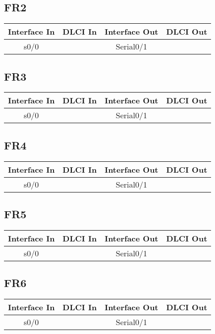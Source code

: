 \documentclass[12pt,a4paper,spanish]{article}
\begin{document}
\subsection{FR2}
\begin{tabular}{|c|c|c|c|}
\hline
Interface In & DLCI In & Interface Out & DLCI Out \\
\hline
\hline
 s0/0 &  & Serial0/1 &  \\
\hline
\end{tabular}

\subsection{FR3}
\begin{tabular}{|c|c|c|c|}
\hline
Interface In & DLCI In & Interface Out & DLCI Out \\
\hline
\hline
 s0/0 &  & Serial0/1 &  \\
\hline
\end{tabular}

\subsection{FR4}
\begin{tabular}{|c|c|c|c|}
\hline
Interface In & DLCI In & Interface Out & DLCI Out \\
\hline
\hline
 s0/0 &  & Serial0/1 &  \\
\hline
\end{tabular}

\subsection{FR5}
\begin{tabular}{|c|c|c|c|}
\hline
Interface In & DLCI In & Interface Out & DLCI Out \\
\hline
\hline
 s0/0 &  & Serial0/1 &  \\
\hline
\end{tabular}

\subsection{FR6}
\begin{tabular}{|c|c|c|c|}
\hline
Interface In & DLCI In & Interface Out & DLCI Out \\
\hline
\hline
 s0/0 &  & Serial0/1 &  \\
\hline
\end{tabular}
\end{document}
